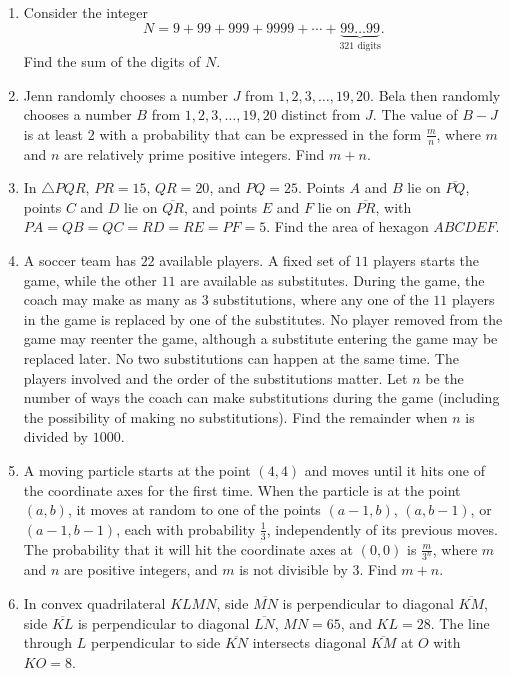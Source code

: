 \documentclass{article}
\begin{document}
\begin{enumerate}[label=\arabic*., itemsep=0.5em]\item Consider the integer 
\begin{equation*}
N = 9 + 99 + 999 + 9999 + \cdots + \underbrace{99\ldots 99}_\text{321 digits}.
\end{equation*}
Find the sum of the digits of \(N\).\par \vspace{0.5em}\item Jenn randomly chooses a number \(J\) from \(1, 2, 3,\ldots, 19, 20\). Bela then randomly chooses a number \(B\) from \(1, 2, 3,\ldots, 19, 20\) distinct from \(J\). The value of \(B - J\) is at least \(2\) with a probability that can be expressed in the form \(\tfrac{m}{n}\), where \(m\) and \(n\) are relatively prime positive integers. Find \(m+n\).\par \vspace{0.5em}\item In \(\triangle PQR\), \(PR=15\), \(QR=20\), and \(PQ=25\). Points \(A\) and \(B\) lie on \(\overline{PQ}\), points \(C\) and \(D\) lie on \(\overline{QR}\), and points \(E\) and \(F\) lie on \(\overline{PR}\), with \(PA=QB=QC=RD=RE=PF=5\). Find the area of hexagon \(ABCDEF\).\par \vspace{0.5em}\item A soccer team has \(22\) available players. A fixed set of \(11\) players starts the game, while the other \(11\) are available as substitutes. During the game, the coach may make as many as \(3\) substitutions, where any one of the \(11\) players in the game is replaced by one of the substitutes. No player removed from the game may reenter the game, although a substitute entering the game may be replaced later. No two substitutions can happen at the same time. The players involved and the order of the substitutions matter. Let \(n\) be the number of ways the coach can make substitutions during the game (including the possibility of making no substitutions). Find the remainder when \(n\) is divided by \(1000\).\par \vspace{0.5em}\item A moving particle starts at the point \((4,4)\) and moves until it hits one of the coordinate axes for the first time. When the particle is at the point \((a,b)\), it moves at random to one of the points \((a-1,b)\), \((a,b-1)\), or \((a-1,b-1)\), each with probability \(\tfrac{1}{3}\), independently of its previous moves. The probability that it will hit the coordinate axes at \((0,0)\) is \(\tfrac{m}{3^n}\), where \(m\) and \(n\) are positive integers, and \(m\) is not divisible by \(3\). Find \(m + n\).\par \vspace{0.5em}\item In convex quadrilateral \(KLMN\), side \(\overline{MN}\) is perpendicular to diagonal \(\overline{KM}\), side \(\overline{KL}\) is perpendicular to diagonal \(\overline{LN}\), \(MN = 65\), and \(KL = 28\). The line through \(L\) perpendicular to side \(\overline{KN}\) intersects diagonal \(\overline{KM}\) at \(O\) with \(KO = 8\). 
\end{enumerate}
\end{document}
